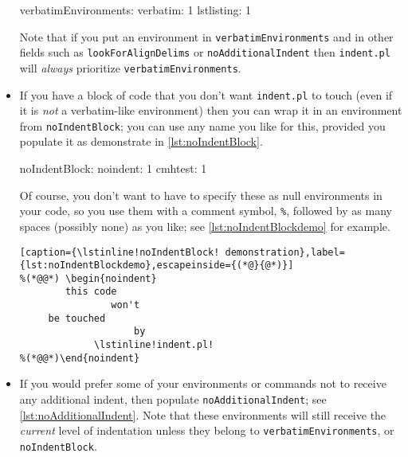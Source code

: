 \begin{itemize}
 		\begin{yaml}[caption={\lstinline!verbatimEnvironments!},label={lst:verbatimEnvironments}]
verbatimEnvironments:
    verbatim: 1
    lstlisting: 1
 		\end{yaml}
 		Note that if  you put an environment in \lstinline!verbatimEnvironments! 
 		and in other fields such as \lstinline!lookForAlignDelims! or \lstinline!noAdditionalIndent! 
 		then \lstinline!indent.pl! will \emph{always} prioritize \lstinline!verbatimEnvironments!.
 		 		 		 		 					
 		\item[\verbitem{noIndentBlock}] If you have a block of code that you don't 
 		want \lstinline!indent.pl! to touch (even if it is \emph{not} a verbatim-like
 		environment) then you can wrap it in an environment from \lstinline!noIndentBlock!;
 		you can use any name you like for this, provided you populate it as demonstrate in 
 		\cref{lst:noIndentBlock}.
 		 		 		 		 					
 		\begin{yaml}[caption={\lstinline!noIndentBlock!},label={lst:noIndentBlock}]
noIndentBlock:
    noindent: 1
    cmhtest: 1
 		\end{yaml}
 		 		 		 		 					
 		Of course, you don't want to have to specify these as null environments
 		in your code, so you use them with a comment symbol, \lstinline!%!, followed 
 		by as many spaces (possibly none) as you like; see \cref{lst:noIndentBlockdemo} for 
 		example.
 		\begin{lstlisting}[caption={\lstinline!noIndentBlock! demonstration},label={lst:noIndentBlockdemo},escapeinside={(*@}{@*)}]
%(*@@*) \begin{noindent} 
        this code
                won't 
     be touched
                    by 
             \lstinline!indent.pl!
%(*@@*)\end{noindent} 
 		\end{lstlisting}
 		 		 		 		 					
 		\item[\verbitem{noAdditionalIndent}] If you would prefer some of your
 		environments or commands not to receive any additional indent, then 
 		populate \lstinline!noAdditionalIndent!; see \cref{lst:noAdditionalIndent}. 
 		Note that these environments will still receive the \emph{current} level
 		of indentation unless they belong to \lstinline!verbatimEnvironments!, or \lstinline!noIndentBlock!.
 		 		 		 		 					

\end{itemize}
